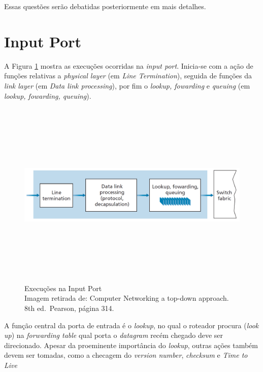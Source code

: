 Essas questões serão debatidas posteriormente em mais detalhes.

\hypertarget{input-port}{%
\section{Input Port}\label{input-port}}

A Figura \ref{Execuções na Input Port} mostra as execuções ocorridas na \emph{input port}.
Inicia-se com a ação de funções relativas a \emph{physical layer} (em
\emph{Line Termination}), seguida de funções da \emph{link layer} (em
\emph{Data link processing}), por fim o \emph{lookup, fowarding} e
\emph{queuing} (em \emph{lookup, fowarding, queuing}).





\begin{figure}[h!]
\centering
\includegraphics[keepaspectratio, width=12cm, height=9cm]{imagens/14/14 - input port.png}
\caption{Execuções na Input Port \\
Imagem retirada de: Computer Networking a top-down approach. 8th
ed.~Pearson, página 314. \\}
\label{Execuções na Input Port}
\end{figure}




A função central da porta de entrada é o \emph{lookup}, no qual o
roteador procura (\emph{look up}) na \emph{forwarding table} qual porta
o \emph{datagram} recém chegado deve ser direcionado. Apesar da
proeminente importância do \emph{lookup}, outras ações também devem ser
tomadas, como a checagem do \emph{version number}, \emph{checksum} e
\emph{Time to Live}

